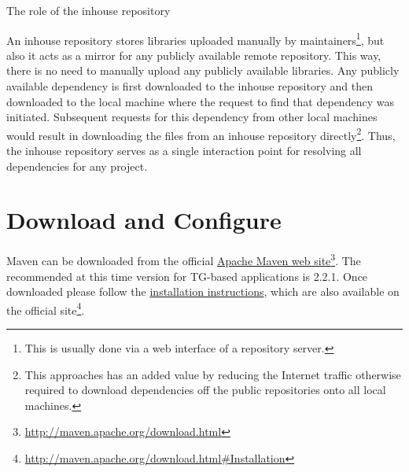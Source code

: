   \begin{image}{The role of the inhouse repository}{\label{img:ch00:01:maven_repository_structure}}    
  \end{image}

  An inhouse repository stores libraries uploaded manually by maintainers\footnote{This is usually done via a web interface of a repository server.}, but also it acts as a mirror for any publicly available remote repository.
  This way, there is no need to manually upload any publicly available libraries.
  Any publicly available dependency is first downloaded to the inhouse repository and then downloaded to the local machine where the request to find that dependency was initiated.
  Subsequent requests for this dependency from other local machines would result in downloading the files from an inhouse repository directly\footnote{
  This approaches has an added value by reducing the Internet traffic otherwise required to download dependencies off the public repositories onto all local machines.
  }.  
  Thus, the inhouse repository serves as a single interaction point for resolving all dependencies for any project.
  
  \section{Download and Configure} 
  Maven can be downloaded from the official \href{http://maven.apache.org/download.html}{Apache Maven web site}\footnote{\url{http://maven.apache.org/download.html}}.
  The recommended at this time version for TG-based applications is 2.2.1.
  Once downloaded please follow the \href{http://maven.apache.org/download.html#Installation}{installation instructions}, which are also available on the official site\footnote{\url{http://maven.apache.org/download.html\#Installation}}.
  

